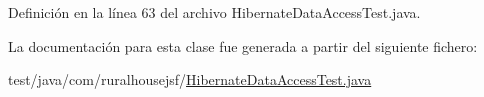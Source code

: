 Definición en la línea 63 del archivo Hibernate\+Data\+Access\+Test.\+java.



La documentación para esta clase fue generada a partir del siguiente fichero\+:\begin{DoxyCompactItemize}
\item 
test/java/com/ruralhousejsf/\mbox{\hyperlink{_hibernate_data_access_test_8java}{Hibernate\+Data\+Access\+Test.\+java}}\end{DoxyCompactItemize}
